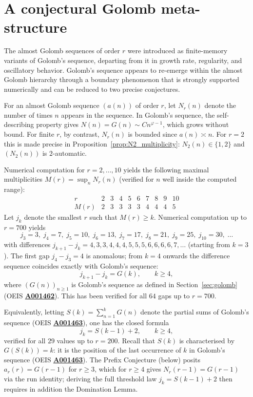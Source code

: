 \documentclass[12pt]{article}
\theoremstyle{definition}
\theoremstyle{remark}
\newcommand{\oeis}[1]{\href{https://oeis.org/#1}{\textbf{#1}}}
\begin{document}
\section{A conjectural Golomb meta-structure}\label{sec:golomb_return}

The almost Golomb sequences of order $r$ were introduced as finite-memory variants
of Golomb's sequence, departing from it in growth rate, regularity, and oscillatory
behavior. Golomb's sequence appears to re-emerge within the almost Golomb
hierarchy through a boundary phenomenon that is strongly supported numerically
and can be reduced to two precise conjectures.

For an almost Golomb sequence $(a(n))$ of order $r$, let $N_r(n)$ denote
the number of times $n$ appears in the sequence.
In Golomb's sequence, the self-describing property gives
$N(n)=G(n)\sim C n^{\varphi-1}$, which grows without bound.
For finite $r$, by contrast, $N_r(n)$ is bounded since $a(n)\asymp n$.
For $r=2$ this is made precise in Proposition~\ref{prop:N2_multiplicity}:
$N_2(n)\in\{1,2\}$ and $(N_2(n))$ is $2$-automatic.

Numerical computation for $r=2,\ldots,10$ yields the following maximal
multiplicities $M(r)=\sup_n N_r(n)$ (verified for $n$ well inside the computed range):
\[
\begin{array}{c|ccccccccc}
  r & 2 & 3 & 4 & 5 & 6 & 7 & 8 & 9 & 10 \\\hline
  M(r) & 2 & 3 & 3 & 3 & 3 & 4 & 4 & 4 & 5
\end{array}
\]
Let $j_k$ denote the smallest $r$ such that $M(r) \ge k$.
Numerical computation up to $r=700$ yields
\[
  j_3=3,\; j_4=7,\; j_5=10,\; j_6=13,\; j_7=17,\; j_8=21,\;
  j_9=25,\; j_{10}=30,\;\ldots
\]
with differences $j_{k+1}-j_k = 4,3,3,4,4,4,5,5,5,6,6,6,6,7,\ldots$
(starting from $k=3$).
The first gap $j_4-j_3=4$ is anomalous; from $k=4$ onwards the
difference sequence coincides exactly with Golomb's sequence:
\[
  j_{k+1}-j_k = G(k), \qquad k\ge 4,
\]
where $(G(n))_{n\ge 1}$ is Golomb's sequence as defined in
Section~\ref{sec:golomb} (OEIS \oeis{A001462}).
This has been verified for all $64$ gaps up to $r=700$.

Equivalently, letting $S(k)=\sum_{n=1}^{k}G(n)$ denote the partial
sums of Golomb's sequence (OEIS \oeis{A001463}), one has the closed formula
\[
  j_k = S(k-1) + 2, \qquad k\ge 4,
\]
verified for all $29$ values up to $r=200$.
Recall that $S(k)$ is characterised by $G(S(k))=k$: it is the position
of the last occurrence of $k$ in Golomb's sequence (OEIS \oeis{A001463}).
The Prefix Conjecture (below) posits $a_r(r)=G(r-1)$ for $r\ge 3$,
which for $r\ge 4$ gives $N_r(r-1)=G(r-1)$ via the run identity;
deriving the full threshold law $j_k=S(k-1)+2$ then requires in
addition the Domination Lemma.
\end{document}
